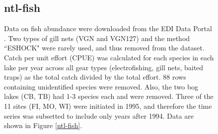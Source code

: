 \documentclass[11pt, oneside]{article}
\begin{document}
\begin{figure}[h!]


\subsection {ntl-fish}

Data on fish abundance were downloaded from the EDI Data Portal \citep{ntl-fish}.
Two types of gill nets (VGN and VGN127) and the method  ``ESHOCK" were rarely used, and thus removed from the dataset.%
Catch per unit effort (CPUE) was calculated for each species in each lake per year across all gear types (electrofishing, gill nets, baited traps) as the total catch divided by the total effort.
88 rows containing unidentified species were removed.
Also, the two bog lakes (CB, TB) had 1-3 species each and were removed. 
Three of the 11 sites (FI, MO, WI) were initiated in 1995, and therefore the time series was subsetted to include only years after 1994.
Data are shown in Figure \ref{ntl-fish}.



\end{figure}
\end{document}
